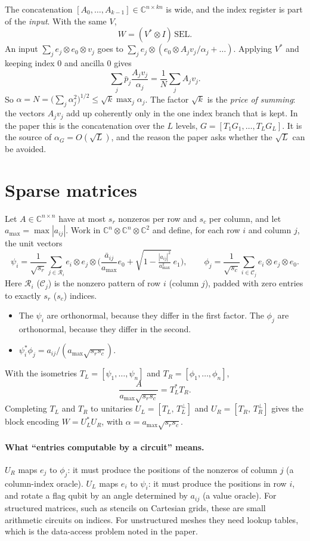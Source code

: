 \documentclass[11pt,a4paper]{article}
\newcommand{\C}{\mathbb{C}}
\begin{document}
The concatenation $[A_0,\dots,A_{k-1}]\in\C^{n\times kn}$ is wide, and the index register is
part of the \emph{input}. With the same $V$,
\[
W=(V^*\otimes I)\,\mathrm{SEL}.
\]
An input $\sum_je_j\otimes e_0\otimes v_j$ goes to $\sum_je_j\otimes(e_0\otimes A_jv_j/\alpha_j+\dots)$.
Applying $V^*$ and keeping index $0$ and ancilla $0$ gives
\[
\sum_j\bar p_j\frac{A_jv_j}{\alpha_j}=\frac1N\sum_jA_jv_j .
\]
So $\alpha=N=\big(\sum_j\alpha_j^2\big)^{1/2}\le\sqrt k\max_j\alpha_j$. The factor $\sqrt k$ is
the \emph{price of summing}: the vectors $A_jv_j$ add up coherently only in
the one index branch that is kept. In the paper this is the concatenation
over the $L$ levels, $G=[T_1G_1,\dots,T_LG_L]$. It is the source of
$\alpha_G=O(\sqrt L)$, and the reason the paper asks whether the $\sqrt L$ can be
avoided.

\section{Sparse matrices}

Let $A\in\C^{n\times n}$ have at most $s_r$ nonzeros per row and $s_c$ per column, and
let $a_{\max}=\max|a_{ij}|$. Work in $\C^n\otimes\C^n\otimes\C^2$ and define, for each row
$i$ and column $j$, the unit vectors
\[
\psi_i=\frac1{\sqrt{s_r}}\sum_{j\in\mathcal R_i}e_i\otimes e_j\otimes\Big(\frac{\bar a_{ij}}{a_{\max}}e_0+\sqrt{1-\tfrac{|a_{ij}|^2}{a_{\max}^2}}\,e_1\Big),\qquad
\phi_j=\frac1{\sqrt{s_c}}\sum_{i\in\mathcal C_j}e_i\otimes e_j\otimes e_0 .
\]
Here $\mathcal R_i$ ($\mathcal C_j$) is the nonzero pattern of row $i$ (column $j$), padded
with zero entries to exactly $s_r$ ($s_c$) indices.
\begin{itemize}
\item The $\psi_i$ are orthonormal, because they differ in the first factor.
  The $\phi_j$ are orthonormal, because they differ in the second.
\item $\psi_i^*\phi_j=a_{ij}/(a_{\max}\sqrt{s_rs_c})$.
\end{itemize}
With the isometries $T_L=[\psi_1,\dots,\psi_n]$ and $T_R=[\phi_1,\dots,\phi_n]$,
\[
\frac{A}{a_{\max}\sqrt{s_rs_c}}=T_L^*T_R .
\]
Completing $T_L$ and $T_R$ to unitaries $U_L=[T_L,\,T_L^\perp]$ and
$U_R=[T_R,\,T_R^\perp]$ gives the block encoding $W=U_L^*U_R$, with
$\alpha=a_{\max}\sqrt{s_rs_c}$.

\paragraph{What ``entries computable by a circuit'' means.} $U_R$ maps $e_j$ to
$\phi_j$: it must produce the positions of the nonzeros of column $j$ (a
column-index oracle). $U_L$ maps $e_i$ to $\psi_i$: it must produce the
positions in row $i$, and rotate a flag qubit by an angle determined by
$a_{ij}$ (a value oracle). For structured matrices, such as stencils on
Cartesian grids, these are small arithmetic circuits on indices. For
unstructured meshes they need lookup tables, which is the data-access
problem noted in the paper.
\end{document}
